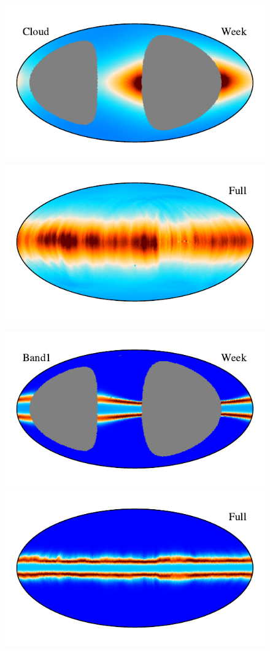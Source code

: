 \documentclass{aa}
\begin{document}
  \begin{figure}
    \centering
    \includegraphics[width=0.9\columnwidth]{figs/zodi_comps/zodi_06_cloud_week.pdf}\includegraphics[width=0.9\columnwidth]{figs/zodi_comps/zodi_06_cloud_full.pdf}

    \vspace{-0.6cm}

    \includegraphics[width=0.9\columnwidth]{figs/zodi_comps/zodi_06_band1_week.pdf}\includegraphics[width=0.9\columnwidth]{figs/zodi_comps/zodi_06_band1_full.pdf}


\end{figure}
\end{document}
